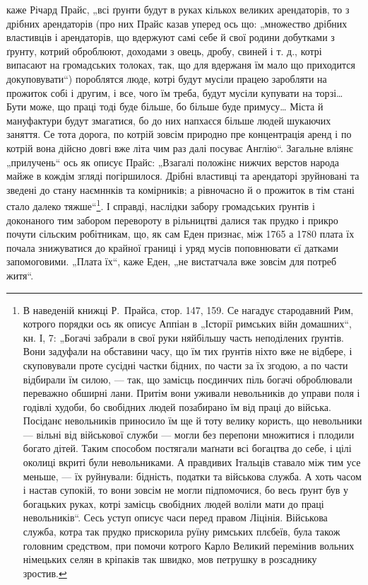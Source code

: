 \parcont{}
каже Річард Прайс, „всі ґрунти будут в руках кількох великих арендаторів, то з дрібних арендаторів (про них Прайс
казав уперед ось що: „множество дрібних властивців і арендаторів, що вдержуют самі себе й свої родини добутками з ґрунту, котрий оброблюют, доходами з овець, дробу, свиней і т. д.,
котрі випасают на громадських толоках, так, що для вдержаня їм мало що приходится докуповувати“)
пороблятся люде, котрі будут мусіли працею заробляти на прожиток собі і другим, і все, чого їм
треба, будут мусіли купувати на торзі\dots{} Бути може, що праці тоді буде більше, бо більше буде примусу\dots{} Міста й
мануфактури будут змагатися, бо до них напхаєся більше людей шукаючих заняття. Се тота дорога, по
котрій зовсім природно пре концентрація аренд і по котрій вона дійсно довгі вже літа чим раз далі
посуває Англію“. Загальне вліянє „прилучень“ ось як описує Прайс: „Взагалі положінє нижчих верстов
народа майже в кождім згляді погіршилося. Дрібні властивці та арендаторі зруйновані та зведені до
стану наємннків та комірників; а рівночасно й о прожиток в тім стані стало далеко тяжше“\footnote{
В наведеній книжці Р.~Прайса, стор. 147, 159. Се нагадує стародавний Рим, котрого порядки ось як
описує Аппіан в „Історії римських війн домашних“, кн. І, 7: „Богачі забрали в свої руки няйбільшу
часть неподілених ґрунтів. Вони задуфали на обставини часу, що їм тих ґрунтів ніхто вже не відбере, і
скуповували проте сусідні частки бідних, по части за їх згодою, а по части відбирали їм силою, — так, що замісць
поєдинчих  піль богачі оброблювали переважно обширні лани. Притім
вони уживали невольників до управи поля і годівлі худоби, бо свобідних
людей позабирано їм від праці до війська. Посіданє невольників приносило їм ще й тоту велику
користь, що невольники — вільні від військової служби — могли без перепони множитися і плодили
богато дітей. Таким способом постягали маґнати всі богацтва до себе, і цілі околиці вкриті були
невольниками. А правдивих Італьців ставало між тим усе меньше, — їх руйнували: бідність, податки та
військова служба. А хоть часом і настав супокій, то вони зовсім не могли підпомочися, бо весь ґрунт
був у богацьких руках, котрі замісць свобідних людей воліли мати до праці невольників“. Сесь уступ
описує часи перед правом Ліцінія. Військова служба, котра так прудко прискорила руїну римських
плєбеїв, була також головним средством, при помочи котрого Карло Великий перемінив вольних німецьких
селян в кріпаків так швидко, мов петрушку в розсаднику зростив.
}. І справді, наслідки забору громадських ґрунтів і доконаного тим забором перевороту в рільництві далися
так прудко і прикро почути сільским робітникам, що, як сам Еден признає, між 1765 а 1780 плата їх
почала знижуватися до крайної границі і уряд мусів поповнювати єї датками запомоговими. „Плата їх“,
каже Еден, „не вистатчала вже зовсім для потреб житя“.
